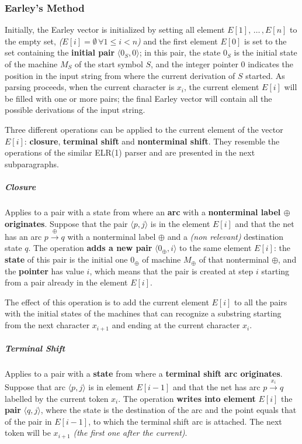 \subsubsection{Earley's Method}

Initially, the Earley vector is initialized by setting all element \(E[1],\,\ldots\,, E[n]\) to the empty set, \textit{(\(E[i] = \emptyset \, \forall 1 \leq i < n\))} and the first element \(E[0]\) is set to the set containing the \textbf{initial pair} \(\langle 0_S, 0 \rangle\);
in this pair, the state \(0_S\) is the initial state of the machine \(M_S\) of the start symbol \(S\), and the integer pointer \(0\) indicates the position in the input string from where the current derivation of \(S\) started.
As parsing proceeds, when the current character is \(x_i\), the current element \(E[i]\) will be filled with one or more pairs;
the final Earley vector will contain all the possible derivations of the input string.

Three different operations can be applied to the current element of the vector \(E[i]\):
\textbf{closure}, \textbf{terminal shift} and \textbf{nonterminal shift}.
They resemble the operations of the similar ELR(1) parser and are presented in the next subparagraphs.

\subparagraph*{Closure}
Applies to a pair with a state from where an \textbf{arc} with a \textbf{nonterminal label \(\oplus\) originates}.
Suppose that the pair \(\langle p, j \rangle\) is in the element \(E[i]\) and that the net has an arc \(p \xrightarrow{\oplus} q\) with a nonterminal label \(\oplus\) and a \textit{(non relevant)} destination state \(q\).
The operation \textbf{adds a new pair} \(\langle 0_\oplus, i \rangle\) to the same element \(E[i]\):
the \textbf{state} of this pair is the initial one \(0_\oplus\) of machine \(M_\oplus\) of that nonterminal \(\oplus\), and the \textbf{pointer} has value \(i\), which means that the pair is created at step \(i\) starting from a pair already in the element \(E[i]\).

The effect of this operation is to add the current element \(E[i]\) to all the pairs with the initial states of the machines that can recognize a substring starting from the next character \(x_{i+1}\) and ending at the current character \(x_i\).

\subparagraph*{Terminal Shift}
Applies to a pair with a \textbf{state} from where a \textbf{terminal shift arc originates}.
Suppose that arc \(\langle p, j \rangle\) is in element \(E[i-1]\) and that the net has arc \(p \xrightarrow{x_i} q\) labelled by the current token \(x_i\).
The operation \textbf{writes into element} \(E[i]\) the \textbf{pair} \(\langle q, j \rangle\), where the state is the destination of the arc and the point equals that of the pair in \(E[i-1]\), to which the terminal shift arc is attached.
The next token will be \(x_{i+1}\) \textit{(the first one after the current)}.

